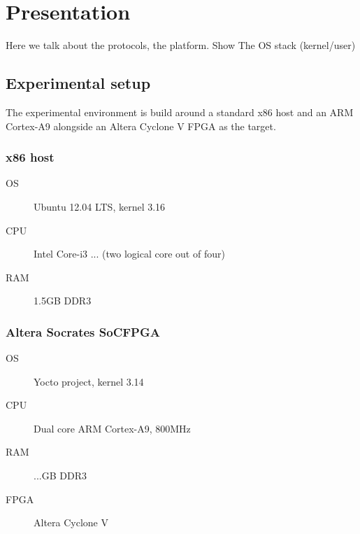 \chapter{Presentation}
Here we talk about the protocols, the platform.
Show The OS stack (kernel/user)

\section{Experimental setup}
The experimental environment is build around a standard x86 host and an ARM Cortex-A9 alongside an Altera Cyclone V FPGA as the target.

\subsection{x86 host}

\begin{framed}
\begin{description}
	\item[OS] Ubuntu 12.04 LTS, kernel 3.16
	\item[CPU] Intel Core-i3 ... (two logical core out of four)
	\item[RAM] 1.5GB DDR3
\end{description}
\end{framed}

\subsection{Altera Socrates SoCFPGA}

\begin{framed}
\begin{description}
	\item[OS] Yocto project, kernel 3.14
	\item[CPU] Dual core ARM Cortex-A9, 800MHz
	\item[RAM] ...GB DDR3
	\item[FPGA] Altera Cyclone V
\end{description}
\end{framed}
